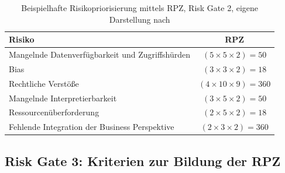 \begin{table}[H]
\centering
\begin{tabular}{|p{9cm}|c|}
\hline
\textbf{Risiko} & \textbf{RPZ} \\ \hline
Mangelnde Datenverfügbarkeit und Zugriffshürden & $(5 \times 5 \times 2) = 50$ \\ \hline
Bias & $(3 \times 3 \times 2) = 18$ \\ \hline
Rechtliche Verstöße & $(4 \times 10 \times 9) = 360$ \\ \hline
Mangelnde Interpretierbarkeit & $(3 \times 5 \times 2) = 50$ \\ \hline
Ressourcenüberforderung & $(2 \times 5 \times 2) = 18$ \\ \hline
Fehlende Integration der Business Perspektive & $(2 \times 3 \times 2) = 360$ \\ \hline
\end{tabular}
\caption{Beispielhafte Risikopriorisierung mittels RPZ, Risk Gate 2, eigene Darstellung nach \cite{Bundesministerium_2018}}
\label{tab:cs2_app_rg2_rpz_risiken}
\end{table}

\subsection{Risk Gate 3: Kriterien zur Bildung der RPZ}

